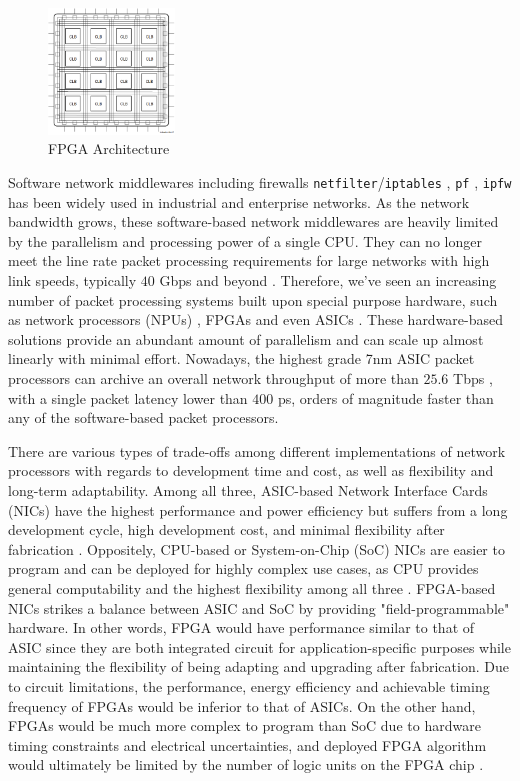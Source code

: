 \documentclass[a4paper]{report}
\newcommand{\code}{\texttt}
\begin{document}
\begin{figure}[h!]
  \centering
  \includegraphics[width=0.3\textwidth]{imgs/fpga-arch.png}
  \caption{FPGA Architecture \cite{xilinx-fpga}}
  \label{fig:fpga-arch}
\end{figure}

Software network middlewares including firewalls \code{netfilter}/\code{iptables} \cite{netfilter-iptables}, \code{pf} \cite{pf}, \code{ipfw} \cite{ipfw} has been widely used in industrial and enterprise networks. As the network bandwidth grows, these software-based network middlewares are heavily limited by the parallelism and processing power of a single CPU. They can no longer meet the line rate packet processing requirements for large networks with high link speeds, typically $40$ Gbps and beyond \cite{fiessler-2016}. Therefore, we've seen an increasing number of packet processing systems built upon special purpose hardware, such as network processors (NPUs) \cite {qi-2007, duo-2006}, FPGAs\cite{hager-2014, fong-2012, jiang-2009, jiang-2009-large} and even ASICs \cite{bosshart-2013}. These hardware-based solutions provide an abundant amount of parallelism and can scale up almost linearly with minimal effort. Nowadays, the highest grade 7nm ASIC packet processors can archive an overall network throughput of more than $25.6$ Tbps \cite{tomahawk-2021}, with a single packet latency lower than $400$ ps, orders of magnitude faster than any of the software-based packet processors.

There are various types of trade-offs among different implementations of network processors with regards to development time and cost, as well as flexibility and long-term adaptability. Among all three, ASIC-based Network Interface Cards (NICs) have the highest performance and power efficiency but suffers from a long development cycle, high development cost, and minimal flexibility after fabrication \cite{amara-2006, deierling-2018}. Oppositely, CPU-based or System-on-Chip (SoC) NICs are easier to program and can be deployed for highly complex use cases, as CPU provides general computability and the highest flexibility among all three \cite{deierling-2018}. FPGA-based NICs strikes a balance between ASIC and SoC by providing "field-programmable" hardware. In other words, FPGA would have performance similar to that of ASIC since they are both integrated circuit for application-specific purposes while maintaining the flexibility of being adapting and upgrading after fabrication. Due to circuit limitations, the performance, energy efficiency and achievable timing frequency of FPGAs would be inferior to that of ASICs. On the other hand, FPGAs would be much more complex to program than SoC due to hardware timing constraints and electrical uncertainties, and deployed FPGA algorithm would ultimately be limited by the number of logic units on the FPGA chip \cite{deierling-2018}.
\end{document}
